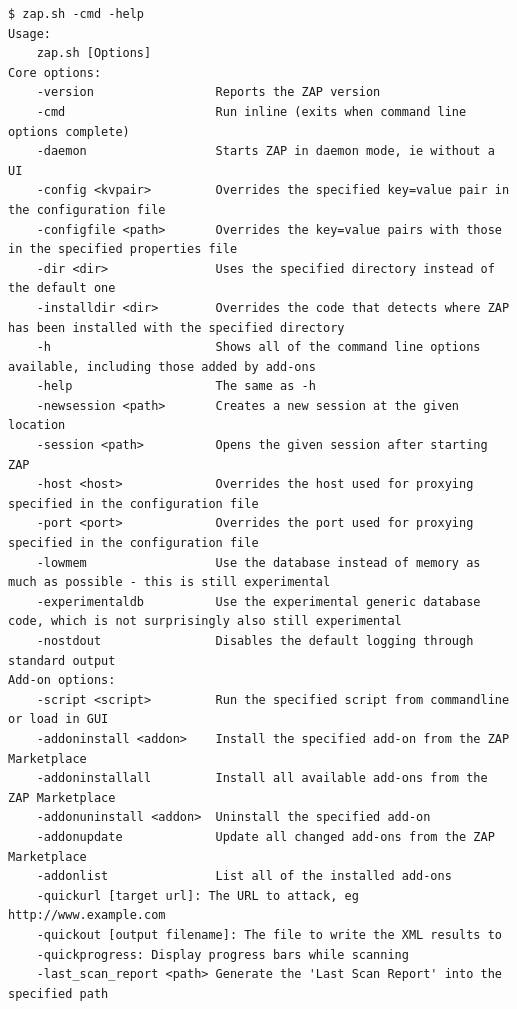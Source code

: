 \begin{minipage}{\linewidth}
	\begin{lstlisting}[caption={Options de ZAP en ligne de commande},label={lst:zap_options},numbers=none]
$ zap.sh -cmd -help
Usage:
    zap.sh [Options]
Core options:
    -version                 Reports the ZAP version
    -cmd                     Run inline (exits when command line options complete)
    -daemon                  Starts ZAP in daemon mode, ie without a UI
    -config <kvpair>         Overrides the specified key=value pair in the configuration file
    -configfile <path>       Overrides the key=value pairs with those in the specified properties file
    -dir <dir>               Uses the specified directory instead of the default one
    -installdir <dir>        Overrides the code that detects where ZAP has been installed with the specified directory
    -h                       Shows all of the command line options available, including those added by add-ons
    -help                    The same as -h
    -newsession <path>       Creates a new session at the given location
    -session <path>          Opens the given session after starting ZAP
    -host <host>             Overrides the host used for proxying specified in the configuration file
    -port <port>             Overrides the port used for proxying specified in the configuration file
    -lowmem                  Use the database instead of memory as much as possible - this is still experimental
    -experimentaldb          Use the experimental generic database code, which is not surprisingly also still experimental
    -nostdout                Disables the default logging through standard output
Add-on options:
    -script <script>         Run the specified script from commandline or load in GUI
    -addoninstall <addon>    Install the specified add-on from the ZAP Marketplace
    -addoninstallall         Install all available add-ons from the ZAP Marketplace
    -addonuninstall <addon>  Uninstall the specified add-on
    -addonupdate             Update all changed add-ons from the ZAP Marketplace
    -addonlist               List all of the installed add-ons
    -quickurl [target url]: The URL to attack, eg http://www.example.com
    -quickout [output filename]: The file to write the XML results to
    -quickprogress: Display progress bars while scanning
    -last_scan_report <path> Generate the 'Last Scan Report' into the specified path
\end{lstlisting}
\end{minipage}

